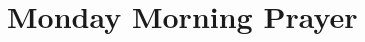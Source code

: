 \null\medskip{%
\parindent 0pt
\noindent
\ifx\preLilyPondExample \undefined
\else
  \expandafter\preLilyPondExample
\fi
\def\lilypondbook{}%

\ifx\postLilyPondExample \undefined
\else
  \expandafter\postLilyPondExample
\fi
}


\newpage

{%
\parindent 0pt
\noindent
\ifx\preLilyPondExample \undefined
\else
  \expandafter\preLilyPondExample
\fi
\def\lilypondbook{}%

\ifx\postLilyPondExample \undefined
\else
  \expandafter\postLilyPondExample
\fi
}


\null\medskip{%
\parindent 0pt
\noindent
\ifx\preLilyPondExample \undefined
\else
  \expandafter\preLilyPondExample
\fi
\def\lilypondbook{}%

\ifx\postLilyPondExample \undefined
\else
  \expandafter\postLilyPondExample
\fi
}

\newpage
\null\newpage

\section{Monday Morning Prayer}

{%
\parindent 0pt
\noindent
\ifx\preLilyPondExample \undefined
\else
  \expandafter\preLilyPondExample
\fi
\def\lilypondbook{}%

\ifx\postLilyPondExample \undefined
\else
  \expandafter\postLilyPondExample
\fi
}


\null\medskip{%
\parindent 0pt
\noindent
\ifx\preLilyPondExample \undefined
\else
  \expandafter\preLilyPondExample
\fi
\def\lilypondbook{}%

\ifx\postLilyPondExample \undefined
\else
  \expandafter\postLilyPondExample
\fi
}

\newpage

{%
\parindent 0pt
\noindent
\ifx\preLilyPondExample \undefined
\else
  \expandafter\preLilyPondExample
\fi
\def\lilypondbook{}%

\ifx\postLilyPondExample \undefined
\else
  \expandafter\postLilyPondExample
\fi
}

